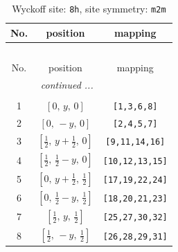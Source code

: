 \documentclass[fleqn,8pt]{jsarticle}
\begin{document}
\begin{longtable}{ccc}
\caption{Wyckoff site: {\tt 8h}, site symmetry: {\tt m2m}}
 \\
 \hline \hline
No. & position & mapping \\ \hline \endfirsthead

\multicolumn{2}{l}{\tablename\ \thetable{}} \\
 \hline \hline
No. & position & mapping \\ \hline \endhead

 \hline \hline
\multicolumn{2}{r}{\footnotesize\it continued ...} \\ \endfoot

 \hline \hline
\multicolumn{2}{r}{} \\ \endlastfoot

1 & $\left[ 0,\, y,\, 0 \right]$ & {\tt [1,3,6,8]} \\ \hline
2 & $\left[ 0,\, - y,\, 0 \right]$ & {\tt [2,4,5,7]} \\ \hline
3 & $\left[ \frac{1}{2},\, y + \frac{1}{2},\, 0 \right]$ & {\tt [9,11,14,16]} \\ \hline
4 & $\left[ \frac{1}{2},\, \frac{1}{2} - y,\, 0 \right]$ & {\tt [10,12,13,15]} \\ \hline
5 & $\left[ 0,\, y + \frac{1}{2},\, \frac{1}{2} \right]$ & {\tt [17,19,22,24]} \\ \hline
6 & $\left[ 0,\, \frac{1}{2} - y,\, \frac{1}{2} \right]$ & {\tt [18,20,21,23]} \\ \hline
7 & $\left[ \frac{1}{2},\, y,\, \frac{1}{2} \right]$ & {\tt [25,27,30,32]} \\ \hline
8 & $\left[ \frac{1}{2},\, - y,\, \frac{1}{2} \right]$ & {\tt [26,28,29,31]} \\
\end{longtable}
\renewcommand{\arraystretch}{1.2}
\end{document}
